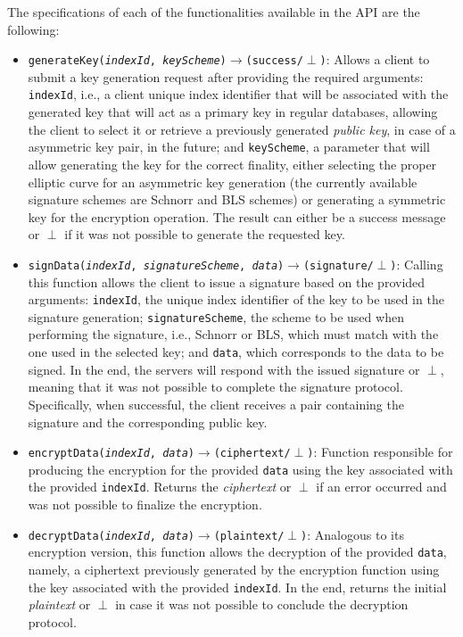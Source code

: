 The specifications of each of the functionalities available in the API are the following:
\begin{itemize}
    \item \texttt{generateKey(\textit{indexId}, \textit{keyScheme})$\longrightarrow$(success/$\perp$)}: Allows a client to submit a key generation request after providing the required arguments: \texttt{indexId}, i.e., a client unique index identifier that will be associated with the generated key that will act as a primary key in regular databases, allowing the client to select it or retrieve a previously generated \textit{public key}, in case of a asymmetric key pair, in the future; and \texttt{keyScheme}, a parameter that will allow generating the key for the correct finality, either selecting the proper elliptic curve for an asymmetric key generation (the currently available signature schemes are Schnorr and BLS schemes) or generating a symmetric key for the encryption operation. The result can either be a success message or $\perp$ if it was not possible to generate the requested key.
    
    \item \texttt{signData(\textit{indexId}, \textit{signatureScheme}, \textit{data})$\longrightarrow$(signature/$\perp$)}: Calling this function allows the client to issue a signature based on the provided arguments: \texttt{indexId}, the unique index identifier of the key to be used in the signature generation; \texttt{signatureScheme}, the scheme to be used when performing the signature, i.e., Schnorr or BLS, which must match with the one used in the selected key; and \texttt{data}, which corresponds to the data to be signed. In the end, the servers will respond with the issued signature or $\perp$, meaning that it was not possible to complete the signature protocol. Specifically, when successful, the client receives a pair containing the signature and the corresponding public key.

    \item \texttt{encryptData(\textit{indexId}, \textit{data})$\longrightarrow$(ciphertext/$\perp$)}: Function responsible for producing the encryption for the provided \texttt{data} using the key associated with the provided \texttt{indexId}. Returns the \textit{ciphertext} or $\perp$ if an error occurred and was not possible to finalize the encryption.

    \item \texttt{decryptData(\textit{indexId}, \textit{data})$\longrightarrow$(plaintext/$\perp$)}: Analogous to its encryption version, this function allows the decryption of the provided \texttt{data}, namely, a ciphertext previously generated by the encryption function using the key associated with the provided \texttt{indexId}. In the end, returns the initial \textit{plaintext} or $\perp$ in case it was not possible to conclude the decryption protocol.
\end{itemize}

